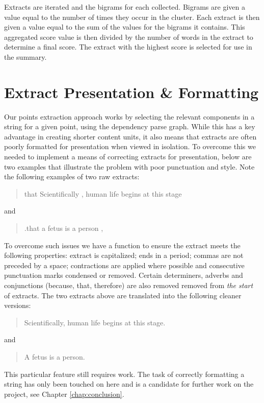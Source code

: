     Extracts are iterated and the bigrams for each collected. Bigrams are given a value equal to the number of times they occur in the cluster. Each extract is then given a value equal to the sum of the values for the bigrams it contains. This aggregated score value is then divided by the number of words in the extract to determine a final score. The extract with the highest score is selected for use in the summary.

  \section{Extract Presentation \& Formatting}
    Our points extraction approach works by selecting the relevant components in a string for a given point, using the dependency parse graph. While this has a key advantage in creating shorter content units, it also means that extracts are often poorly formatted for presentation when viewed in isolation. To overcome this we needed to implement a means of correcting extracts for presentation, below are two examples that illustrate the problem with poor punctuation and style. Note the following examples of two raw extracts: \blockquote{that Scientifically , human life begins at this stage} and \blockquote{.that a fetus is a person ,}.

    To overcome such issues we have a function to ensure the extract meets the following properties: extract is capitalized; ends in a period; commas are not preceded by a space; contractions are applied where possible and consecutive punctuation marks condensed or removed. Certain determiners, adverbs and conjunctions (because, that, therefore) are also removed removed from \textit{the start} of extracts. The two extracts above are translated into the following cleaner versions: \blockquote{Scientifically, human life begins at this stage.} and \blockquote{A fetus is a person.}.

    This particular feature still requires work. The task of correctly formatting a string has only been touched on here and is a candidate for further work on the project, see Chapter \ref{chap:conclusion}.

